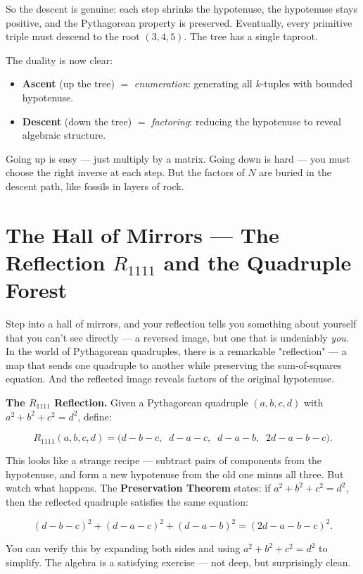 \documentclass[11pt,twoside,openright]{book}
\theoremstyle{definition}
\theoremstyle{remark}
\begin{document}
So the descent is genuine: each step shrinks the hypotenuse, the hypotenuse stays positive, and the Pythagorean property is preserved. Eventually, every primitive triple must descend to the root $(3, 4, 5)$. The tree has a single taproot.

The duality is now clear:

\begin{itemize}
  \item \textbf{Ascent} (up the tree) $=$ \textit{enumeration}: generating all $k$-tuples with bounded hypotenuse.
  \item \textbf{Descent} (down the tree) $=$ \textit{factoring}: reducing the hypotenuse to reveal algebraic structure.
\end{itemize}

Going up is easy --- just multiply by a matrix. Going down is hard --- you must choose the right inverse at each step. But the factors of $N$ are buried in the descent path, like fossils in layers of rock.



\section{The Hall of Mirrors --- The Reflection $R_{1111}$ and the Quadruple Forest}

Step into a hall of mirrors, and your reflection tells you something about yourself that you can't see directly --- a reversed image, but one that is undeniably \textit{you}. In the world of Pythagorean quadruples, there is a remarkable "reflection" --- a map that sends one quadruple to another while preserving the sum-of-squares equation. And the reflected image reveals factors of the original hypotenuse.

\textbf{The $R_{1111}$ Reflection.} Given a Pythagorean quadruple $(a, b, c, d)$ with $a^2 + b^2 + c^2 = d^2$, define:

\[R_{1111}(a, b, c, d) = \big(d - b - c,\;\; d - a - c,\;\; d - a - b,\;\; 2d - a - b - c\big).\]

This looks like a strange recipe --- subtract pairs of components from the hypotenuse, and form a new hypotenuse from the old one minus all three. But watch what happens. The \textbf{Preservation Theorem} states: if $a^2 + b^2 + c^2 = d^2$, then the reflected quadruple satisfies the same equation:

\[(d - b - c)^2 + (d - a - c)^2 + (d - a - b)^2 = (2d - a - b - c)^2.\]

You can verify this by expanding both sides and using $a^2 + b^2 + c^2 = d^2$ to simplify. The algebra is a satisfying exercise --- not deep, but surprisingly clean.
\end{document}
